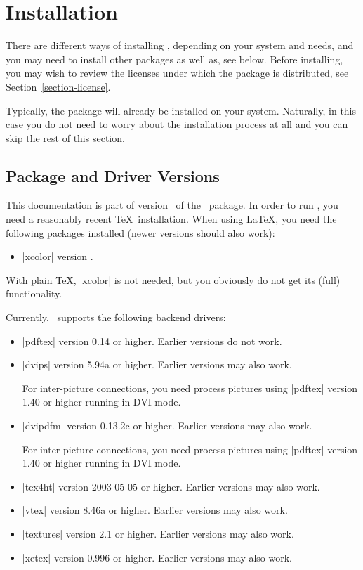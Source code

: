 %
%
%

\section{Installation}

There are different ways of installing \pgfname, depending
on your system and needs, and you may need to install other
packages as well as, see below. Before installing, you may wish to
review the licenses under which the package is
distributed, see Section~\ref{section-license}. 

Typically, the package will already be installed on your
system. Naturally, in this case you do not need to worry about the
installation process at all and you can skip the rest of this
section. 


\subsection{Package and Driver Versions}

This documentation is part of version \pgfversion\ of the \pgfname\
package. In order to run \pgfname, you need a reasonably recent 
\TeX\ installation. When using \LaTeX, you need the following packages
installed (newer versions should also work):
\begin{itemize}
\item
  |xcolor| version \xcolorversion.
\end{itemize}
With plain \TeX, |xcolor| is not needed, but you obviously do not
get its (full) functionality. 

Currently, \pgfname\ supports the following backend drivers:
\begin{itemize}
\item
  |pdftex| version 0.14 or higher. Earlier versions do not work.
\item
  |dvips| version 5.94a or higher. Earlier versions may also work.

  For inter-picture connections, you need process pictures using
  |pdftex| version 1.40 or higher running in DVI mode.
\item
  |dvipdfm| version 0.13.2c or higher. Earlier versions may also work.

  For inter-picture connections, you need process pictures using
  |pdftex| version 1.40 or higher running in DVI mode.
\item
  |tex4ht| version 2003-05-05 or higher. Earlier versions may also work.
\item
  |vtex| version 8.46a or higher. Earlier versions may also work.
\item
  |textures| version 2.1 or higher. Earlier versions may also work.
\item
  |xetex| version 0.996 or higher. Earlier versions may also work.
\end{itemize}

